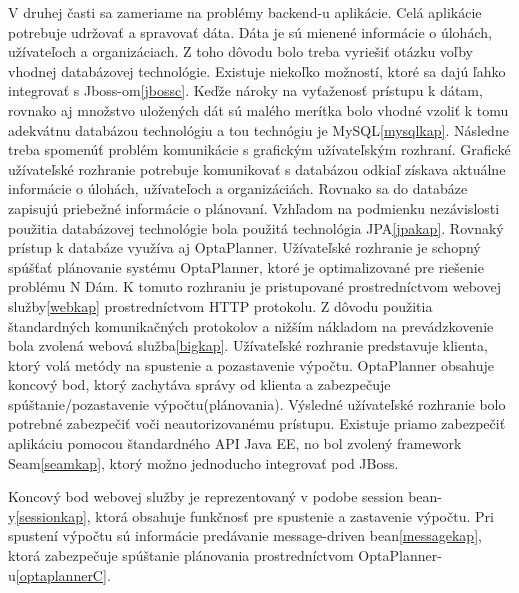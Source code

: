 V druhej časti sa zameriame na problémy backend-u aplikácie. Celá aplikácie potrebuje udržovať a spravovať dáta. Dáta je sú mienené informácie o úlohách, užívateľoch a organizáciach. Z toho dôvodu bolo treba vyriešiť otázku voľby vhodnej databázovej technológie. Existuje niekoľko možností, ktoré sa dajú ľahko integrovať s Jboss-om\ref{jbossc}. Keďže nároky na vyťaženosť prístupu k dátam, rovnako aj množstvo uložených dát sú malého merítka bolo vhodné vzoliť k tomu adekvátnu databázou technológiu a tou technógiu je MySQL\ref{mysqlkap}. Následne treba spomenúť problém komunikácie s grafickým užívateľským rozhraní. Grafické užívateľské rozhranie potrebuje komunikovať s databázou odkiaľ získava aktuálne informácie o úlohách, užívateľoch a organizáciách. Rovnako sa do databáze zapisujú priebežné informácie o plánovaní. Vzhľadom na podmienku nezávislosti použitia databázovej technológie bola použitá technológia JPA\ref{jpakap}. Rovnaký prístup k databáze využíva aj OptaPlanner. Užívateľské rozhranie je schopný spúšťať plánovanie systému OptaPlanner, ktoré je optimalizované pre riešenie problému N Dám. K tomuto rozhraniu je pristupované prostredníctvom webovej služby\ref{webkap} prostredníctvom HTTP protokolu. Z dôvodu použitia štandardných komunikačných protokolov a nižším nákladom na prevádzkovenie bola zvolená  webová služba\ref{bigkap}. Užívateľské rozhranie predstavuje klienta, ktorý volá metódy na spustenie a pozastavenie výpočtu. OptaPlanner obsahuje koncový bod, ktorý zachytáva správy od klienta a zabezpečuje spúštanie/pozastavenie výpočtu(plánovania). Výsledné užívateľské rozhranie bolo potrebné zabezpečiť voči neautorizovanému prístupu. Existuje priamo zabezpečiť aplikáciu pomocou štandardného API Java EE, no bol zvolený framework Seam\ref{seamkap}, ktorý možno jednoducho integrovať pod JBoss.

Koncový bod webovej služby je reprezentovaný v podobe session bean-y\ref{sessionkap}, ktorá obsahuje funkčnosť pre spustenie a zastavenie výpočtu. Pri spustení výpočtu sú informácie predávanie message-driven bean\ref{messagekap}, ktorá zabezpečuje spúštanie plánovania prostredníctvom OptaPlanner-u\ref{optaplannerC}.


